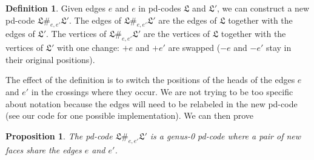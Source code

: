 \documentclass[amsmath,secnumarabic,floatfix,amssymb,nofootinbib,nobibnotes,letterpaper,11pt,tightenlines,showkeys]{revtex4}
\newtheorem{proposition}[theorem]{Proposition}
\theoremstyle{definition}
\newtheorem{definition}[theorem]{Definition}
\begin{document}
\begin{definition}
Given edges $e$ and $e$ in pd-codes $\mathfrak{L}$ and $\mathfrak{L}'$, we can construct a new pd-code $\mathfrak{L} \#_{e,e'} \mathfrak{L'}$. The edges of $\mathfrak{L} \#_{e,e'} \mathfrak{L'}$ are the edges of $\mathfrak{L}$ together with the edges of $\mathfrak{L'}$. The vertices of $\mathfrak{L} \#_{e,e'} \mathfrak{L'}$ are the vertices of $\mathfrak{L}$ together with the vertices of $\mathfrak{L'}$ with one change: $+e$ and $+e'$ are swapped ($-e$ and $-e'$ stay in their original positions).
\end{definition}
The effect of the definition is to switch the positions of the heads of the edges $e$ and $e'$ in the crossings where they occur. We are not trying to be too specific about notation because the edges will need to be relabeled in the new pd-code (see our code for one possible implementation).
We can then prove
\begin{proposition}
The pd-code $\mathfrak{L} \#_{e,e'} \mathfrak{L'}$ is a genus-0 pd-code where a pair of new faces share the edges $e$ and $e'$.
\end{proposition}
\end{document}
